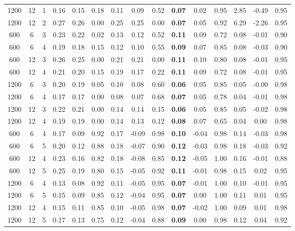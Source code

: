 \begin{table}[ht]
\begin{tabular}{||ccc||ccc|ccc|ccc|ccc}
  1200 & 12 & 1 & 0.16 & 0.15 & 0.18 & 0.11 & 0.09 & 0.52 & \bf 0.07 & 0.02 & 0.95 & 2.85 & -0.49 & 0.95 \\ 
  1200 & 12 & 2 & 0.27 & 0.26 & 0.00 & 0.25 & 0.25 & 0.00 & \bf 0.07 & 0.05 & 0.92 & 6.29 & -2.26 & 0.95 \\ 
   \hline
\hline
600 & 6 & 3 & 0.23 & 0.22 & 0.02 & 0.13 & 0.12 & 0.52 & \bf 0.11 & 0.09 & 0.72 & 0.08 & -0.01 & 0.90 \\ 
  600 & 6 & 4 & 0.19 & 0.18 & 0.15 & 0.12 & 0.10 & 0.55 & \bf 0.09 & 0.07 & 0.85 & 0.08 & -0.03 & 0.90 \\ 
  600 & 12 & 3 & 0.26 & 0.25 & 0.00 & 0.21 & 0.21 & 0.00 & \bf 0.11 & 0.10 & 0.80 & 0.08 & -0.01 & 0.95 \\ 
  600 & 12 & 4 & 0.21 & 0.20 & 0.15 & 0.19 & 0.17 & 0.22 & \bf 0.11 & 0.09 & 0.72 & 0.08 & -0.01 & 0.95 \\ 
   \hline
1200 & 6 & 3 & 0.20 & 0.19 & 0.05 & 0.10 & 0.08 & 0.60 & \bf 0.06 & 0.05 & 0.85 & 0.05 & -0.00 & 0.98 \\ 
  1200 & 6 & 4 & 0.17 & 0.17 & 0.00 & 0.08 & 0.07 & 0.68 & \bf 0.07 & 0.05 & 0.78 & 0.04 & -0.01 & 0.98 \\ 
  1200 & 12 & 3 & 0.22 & 0.21 & 0.00 & 0.14 & 0.14 & 0.15 & \bf 0.06 & 0.05 & 0.85 & 0.05 & -0.02 & 0.98 \\ 
  1200 & 12 & 4 & 0.19 & 0.19 & 0.00 & 0.14 & 0.13 & 0.12 & \bf 0.08 & 0.07 & 0.65 & 0.04 & 0.00 & 0.98 \\ 
   \hline
\hline
600 & 6 & 4 & 0.17 & 0.09 & 0.92 & 0.17 & -0.09 & 0.98 & \bf 0.10 & -0.04 & 0.98 & 0.14 & -0.03 & 0.98 \\ 
  600 & 6 & 5 & 0.20 & 0.12 & 0.88 & 0.18 & -0.07 & 0.90 & \bf 0.12 & -0.03 & 0.98 & 0.18 & -0.03 & 0.92 \\ 
  600 & 12 & 4 & 0.23 & 0.16 & 0.82 & 0.18 & -0.08 & 0.85 & \bf 0.12 & -0.05 & 1.00 & 0.16 & -0.01 & 0.88 \\ 
  600 & 12 & 5 & 0.25 & 0.19 & 0.80 & 0.15 & -0.05 & 0.92 & \bf 0.11 & -0.01 & 0.98 & 0.15 & 0.02 & 0.95 \\ 
   \hline
1200 & 6 & 4 & 0.13 & 0.08 & 0.92 & 0.11 & -0.05 & 0.95 & \bf 0.07 & -0.01 & 1.00 & 0.10 & -0.01 & 0.95 \\ 
  1200 & 6 & 5 & 0.15 & 0.09 & 0.85 & 0.12 & -0.04 & 0.95 & \bf 0.07 & 0.00 & 1.00 & 0.11 & 0.01 & 0.95 \\ 
  1200 & 12 & 4 & 0.15 & 0.11 & 0.85 & 0.10 & -0.05 & 0.98 & \bf 0.07 & -0.02 & 1.00 & 0.09 & 0.01 & 0.98 \\ 
  1200 & 12 & 5 & 0.17 & 0.13 & 0.75 & 0.12 & -0.04 & 0.88 & \bf 0.09 & 0.00 & 0.98 & 0.12 & 0.04 & 0.92 \\ 
   \hline
\hline
\end{tabular}
\end{table}

